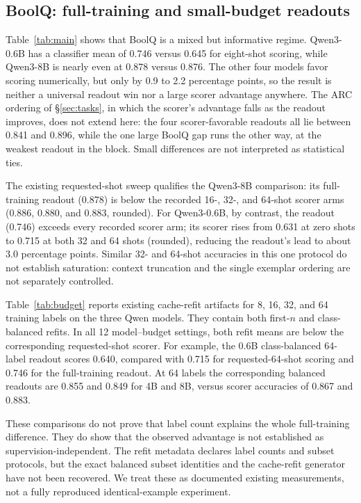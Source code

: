 

\subsection{BoolQ: full-training and small-budget readouts}
\label{sec:boolq}

Table~\ref{tab:main} shows that BoolQ is a mixed but informative regime.
Qwen3-0.6B has a classifier mean of 0.746 versus 0.645 for eight-shot
scoring, while Qwen3-8B is nearly even at 0.878 versus 0.876. The other
four models favor scoring numerically, but only by 0.9 to 2.2 percentage
points, so the result is neither a universal readout win nor a large scorer
advantage anywhere. The ARC ordering of \S\ref{sec:tasks}, in which the
scorer's advantage falls as the readout improves, does not extend here: the
four scorer-favorable readouts all lie between 0.841 and 0.896, while the one
large BoolQ gap runs the other way, at the weakest readout in the block.
Small differences are not interpreted as statistical ties.

The existing requested-shot sweep qualifies the Qwen3-8B comparison: its
full-training readout (0.878) is below the recorded 16-, 32-, and 64-shot
scorer arms (0.886, 0.880, and 0.883, rounded). For Qwen3-0.6B, by contrast,
the readout (0.746) exceeds every recorded scorer arm; its scorer rises from
0.631 at zero shots to 0.715 at both 32 and 64 shots (rounded), reducing the
readout's lead to about 3.0 percentage points. Similar 32- and 64-shot
accuracies in this one protocol do not establish saturation: context
truncation and the single exemplar ordering are not separately controlled.

Table~\ref{tab:budget} reports existing cache-refit artifacts for 8, 16,
32, and 64 training labels on the three Qwen models. They contain both
first-$n$ and class-balanced refits. In all 12 model--budget settings,
both refit means are below the corresponding requested-shot scorer.
For example, the 0.6B class-balanced 64-label readout scores 0.640,
compared with 0.715 for requested-64-shot scoring and 0.746 for the
full-training readout. At 64 labels the corresponding balanced readouts
are 0.855 and 0.849 for 4B and 8B, versus scorer accuracies of 0.867 and
0.883.

These comparisons do not prove that label count explains the whole
full-training difference. They do show that the observed advantage is not
established as supervision-independent. The refit metadata declares label
counts and subset protocols, but the exact balanced subset identities and
the cache-refit generator have not been recovered. We treat these as
documented existing measurements, not a fully reproduced identical-example
experiment.

